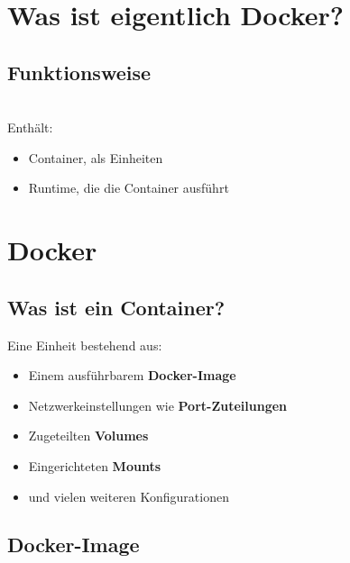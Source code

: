 \section{Was ist eigentlich Docker?}\label{sec:docker-runtime}
\subsection{Funktionsweise}

\begin{frame}
    \slidehead
    \vspace{-1em}
    \Large
    \centering
    
    \\
    Enthält:
    \begin{itemize}
        \item Container, als Einheiten
        \item Runtime, die die Container ausführt
    \end{itemize}
\end{frame}

\section{Docker}

\subsection{Was ist ein Container?}

\begin{frame}
    \slidehead
    \vspace{-1em}
    \Large
    \centering
    Eine Einheit bestehend aus:
    \begin{itemize}
        \item Einem ausführbarem \textbf{Docker-Image}
        \item Netzwerkeinstellungen wie \textbf{Port-Zuteilungen}
        \item Zugeteilten \textbf{Volumes}
        \item Eingerichteten \textbf{Mounts}
        \item und vielen weiteren Konfigurationen
    \end{itemize}
\end{frame}


\subsection{Docker-Image}

